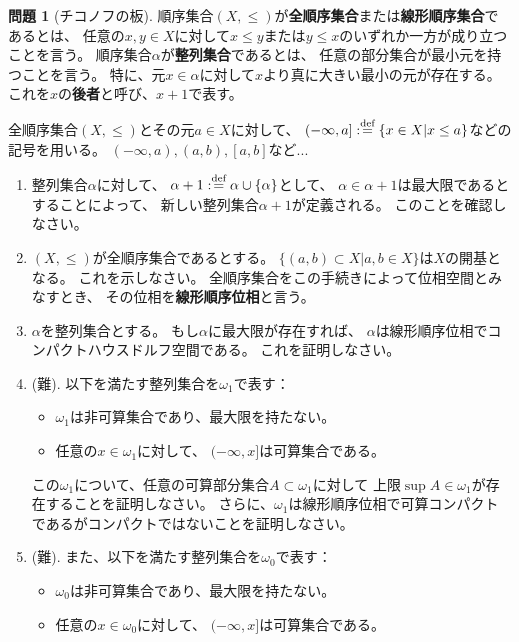 \documentclass[uplatex]{jsarticle}
\theoremstyle{definition}
\newtheorem{prob}[prob]{問題}
\newcommand{\dfn}{:\overset{\mbox{{\scriptsize def}}}{=}}
\begin{document}
\begin{prob}[チコノフの板]\label{Tychonoff plank}
  順序集合\((X,\leq)\)が\textbf{全順序集合}または\textbf{線形順序集合}であるとは、
  任意の\(x,y\in X\)に対して\(x\leq y\)または\(y\leq x\)のいずれか一方が成り立つことを言う。
  順序集合\(\alpha\)が\textbf{整列集合}であるとは、
  任意の部分集合が最小元を持つことを言う。
  特に、元\(x\in \alpha\)に対して\(x\)より真に大きい最小の元が存在する。
  これを\(x\)の\textbf{後者}と呼び、\(x+1\)で表す。

  全順序集合\((X,\leq)\)とその元\(a\in X\)に対して、
  \((-\infty,a]\dfn \{x\in X|x\leq a\}\)などの記号を用いる。
  \((-\infty,a),(a,b),[a,b]\)など...
  \begin{enumerate}
    \item
    整列集合\(\alpha\)に対して、
    \(\alpha + 1 \dfn \alpha \cup \{\alpha\}\)として、
    \(\alpha\in \alpha + 1\)は最大限であるとすることによって、
    新しい整列集合\(\alpha + 1\)が定義される。
    このことを確認しなさい。
    \item
    \((X,\leq)\)が全順序集合であるとする。
    \(\{(a,b)\subset X|a,b\in X\}\)は\(X\)の開基となる。
    これを示しなさい。
    全順序集合をこの手続きによって位相空間とみなすとき、
    その位相を\textbf{線形順序位相}と言う。
    \item
    \(\alpha\)を整列集合とする。
    もし\(\alpha\)に最大限が存在すれば、
    \(\alpha\)は線形順序位相でコンパクトハウスドルフ空間である。
    これを証明しなさい。
    \item \label{omega1}
    (難).
    以下を満たす整列集合を\(\omega_1\)で表す：
    \begin{itemize}
      \item \(\omega_1\)は非可算集合であり、最大限を持たない。
      \item 任意の\(x\in \omega_1\)に対して、
      \((-\infty,x]\)は可算集合である。
    \end{itemize}
    この\(\omega_1\)について、任意の可算部分集合\(A\subset \omega_1\)に対して
    上限\(\sup A\in \omega_1\)が存在することを証明しなさい。
    さらに、\(\omega_1\)は線形順序位相で可算コンパクトであるがコンパクトではないことを証明しなさい。
    \item (難).
    また、以下を満たす整列集合を\(\omega_0\)で表す：
    \begin{itemize}
      \item \(\omega_0\)は非可算集合であり、最大限を持たない。
      \item 任意の\(x\in \omega_0\)に対して、
      \((-\infty,x]\)は可算集合である。

\end{itemize}
\end{enumerate}
\end{prob}
\end{document}
